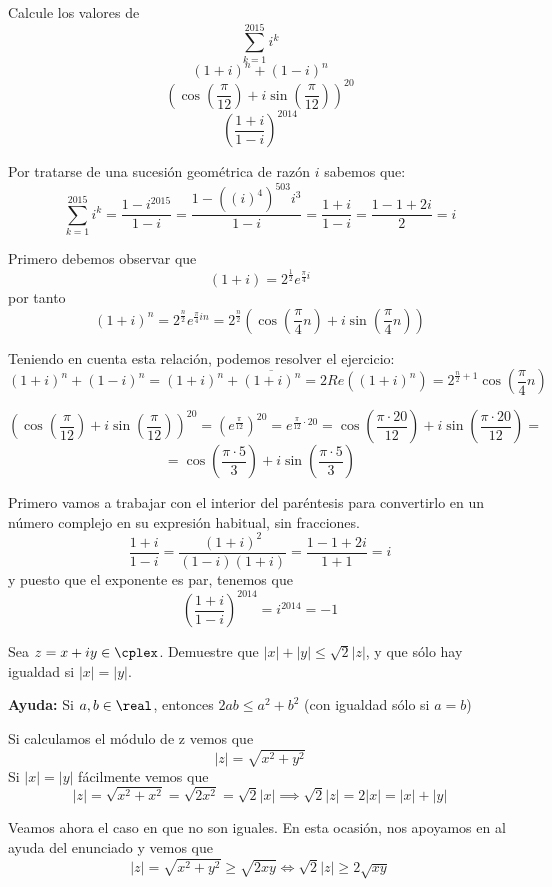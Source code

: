 \begin{problem}[2]
Calcule los valores de
\ppart
\[\sum_{k=1}^{2015}i^k\]
\ppart
\[(1+i)^n+(1-i)^n\]
\ppart
\[\left( \cos \left( \frac{\pi}{12} \right) + i \sin \left( \frac{\pi}{12} \right)\right)^{20}\]
\ppart
\[\left(\frac{1+i}{1-i}\right)^{2014}\]
\solution

\spart
Por tratarse de una sucesión geométrica de razón $i$ sabemos que:
\[\sum_{k=1}^{2015}i^k = \frac{1-i^{2015}}{1-i}=\frac{1-\left((i)^4\right)^{503}i^3}{1-i}=\frac{1+i}{1-i}=\frac{1-1+2i}{2}=i\]

\spart
Primero debemos observar que
\large
\[(1+i) = 2^{\frac{1}{2}}e^{\frac{\pi}{4}i}\]
\normalsize
por tanto
\[ (1+i)^n= 2^{\frac{n}{2}}e^{\frac{\pi}{4}in} = 2^{\frac{n}{2}}\left(\cos\left(\frac{\pi}{4}n\right)+i \sin\left(\frac{\pi}{4}n\right)\right)\]

Teniendo en cuenta esta relación, podemos resolver el ejercicio:
\[(1+i)^n+(1-i)^n = (1+i)^n+\overline{(1+i)^n} = 2 Re((1+i)^n)=2^{\frac{n}{2}+1}\cos\left(\frac{\pi}{4}n\right)\]

\spart
\[\left( \cos \left( \frac{\pi}{12} \right) + i \sin \left( \frac{\pi}{12} \right)\right)^{20}=\left(e^{\frac{\pi}{12}}\right)^{20} = e^{\frac{\pi}{12}\cdot 20} = \cos \left( \frac{\pi\cdot 20}{12} \right) + i \sin \left( \frac{\pi\cdot 20}{12} \right) =\]
\[=\cos \left( \frac{\pi\cdot 5}{3} \right) + i \sin \left( \frac{\pi \cdot 5}{3} \right)\]

\spart
Primero vamos a trabajar con el interior del paréntesis para convertirlo en un número complejo en su expresión habitual, sin fracciones.
\[\frac{1+i}{1-i}=\frac{(1+i)^2}{(1-i)(1+i)} = \frac{1-1+2i}{1+1} = i\]
y puesto que el exponente es par, tenemos que
\[\left(\frac{1+i}{1-i}\right)^{2014}=i^{2014}=-1\]
\end{problem}

\begin{problem}[3]
Sea $z=x+iy \in \cplex$. Demuestre que $|x|+|y|\leq \sqrt{2}|z|$, y que sólo hay igualdad si $|x|=|y|$.

\textbf{Ayuda:} Si $a,b \in \real$, entonces $2ab \leq a^2 + b^2$ (con igualdad sólo si $a=b$)

\solution


Si calculamos el módulo de z vemos que
\[|z|=\sqrt{x^2+y^2}\]
Si $|x|=|y|$ fácilmente vemos que
\[|z|=\sqrt{x^2+x^2}=\sqrt{2x^2}=\sqrt{2}|x| \implies \sqrt{2}|z|=2|x|=|x|+|y|\]

Veamos ahora el caso en que no son iguales. En esta ocasión, nos apoyamos en al ayuda del enunciado y vemos que
\[|z|=\sqrt{x^2+y^2} \geq \sqrt{2xy} \iff \sqrt{2}|z| \geq 2\sqrt{xy}\]


\end{problem}

